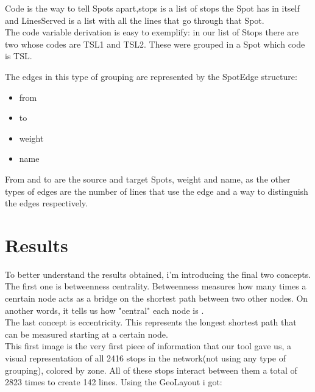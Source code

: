 \documentclass[12pt]{article}
\begin{document}
\begin{multicols}{2}
Code is the way to tell Spots apart,stops is a list of stops the Spot has in itself and LinesServed is a list with all the lines that go through that Spot.\\
The code variable derivation is easy to exemplify: in our list of Stops there are two whose codes are TSL1 and TSL2. These were grouped in a Spot which code is TSL.

The edges in this type of grouping are represented by the SpotEdge structure:
\begin{itemize}
\item from
\item to
\item weight
\item name
\end{itemize}

From and to are the source and target Spots, weight and name, as the other types of edges are the number of lines that use the edge and a way to distinguish the edges respectively.
	
\section{Results}
	To better understand the results obtained, i'm introducing the final two concepts.
	The first one is betweenness centrality. Betweenness measures how many times a cenrtain node acts as a bridge on the shortest path between two other nodes. On another words, it tells us how "central" each node is \cite{freeman1977set}.\\
	The last concept is eccentricity. This represents the longest shortest path that can be measured starting at a certain node\cite{Hage199557}.\\
	This first image is the very first piece of information that our tool gave us, a visual representation of all 2416 stops in the network(not using any type of grouping), colored by zone. All of these stops interact between them a total of 2823 times to create 142 lines. Using the GeoLayout i got:\\


\end{multicols}
\end{document}

